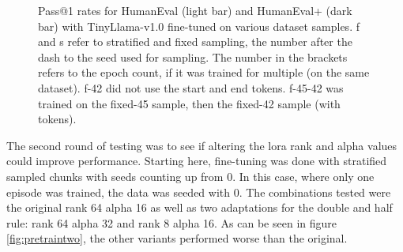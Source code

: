 \begin{figure}[H]
    \centering
    \caption{Pass@1 rates for HumanEval (light bar) and HumanEval+ (dark bar) with TinyLlama-v1.0 fine-tuned on various dataset samples. f and s refer to stratified and fixed sampling, the number after the dash to the seed used for sampling. The number in the brackets refers to the epoch count, if it was trained for multiple (on the same dataset). f-42 did not use the start and end tokens. f-45-42 was trained on the fixed-45 sample, then the fixed-42 sample (with tokens).}
    \label{fig:pretrainone}
\end{figure}

The second round of testing was to see if altering the \ac{lora} rank and alpha values could improve performance.
Starting here, fine-tuning was done with stratified sampled chunks with seeds counting up from 0.
In this case, where only one episode was trained, the data was seeded with 0.
The combinations tested were the original rank 64 alpha 16 as well as two adaptations for the double and half rule: rank 64 alpha 32 and rank 8 alpha 16.
As can be seen in figure \ref{fig:pretraintwo}, the other variants performed worse than the original.

